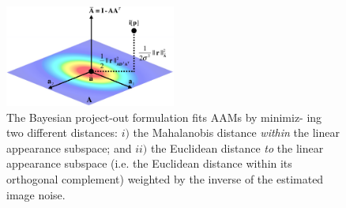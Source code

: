 \begin{figure}
    \centering
    \includegraphics[width=0.50\textwidth]{figures/bayes.png}
    \caption{The Bayesian project-out formulation fits AAMs by minimiz- ing two different distances: $i)$ the Mahalanobis distance \emph{within} the linear appearance subspace; and $ii)$ the Euclidean distance \emph{to} the linear appearance subspace (i.e. the Euclidean distance within its orthogonal complement) weighted by the inverse of the estimated image noise.}
    \label{fig:bayes}
\end{figure}
